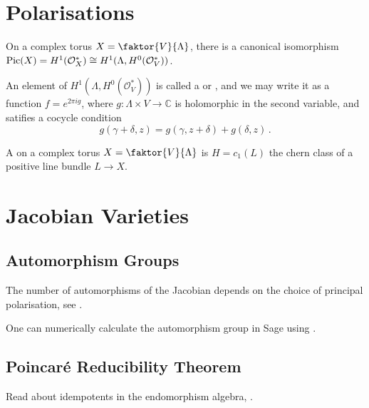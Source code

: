 \documentclass{article}
\begin{document}
\section{Polarisations}
\begin{lemma}
	On a complex torus $X = \faktor{V}{\Lambda}$, there is a canonical isomorphism $\operatorname{Pic}(X) = H^1(\mathcal{O}_X^\ast) \cong H^1(\Lambda , H^0(\mathcal{O}_V^\ast))$. 
\end{lemma}
An element of $H^1(\Lambda , H^0(\mathcal{O}_V^\ast))$ is called a  or , and we may write it as a function $f = e^{2 \pi i g}$, where $g:\Lambda \times V \to \mathbb{C}$ is holomorphic in the second variable, and satifies a cocycle condition 
\[
g(\gamma + \delta, z) = g(\gamma, z+\delta) + g(\delta, z) \, . 
\] 


\begin{definition}
	A  on a complex torus $X = \faktor{V}{\Lambda}$ is $H=  c_1(L)$ the chern class of a positive line bundle $L \to X$. 
\end{definition}


\section{Jacobian Varieties}




\subsection{Automorphism Groups}
The number of automorphisms of the Jacobian depends on the choice of principal polarisation, see \cite{Lee2018}. 

One can numerically calculate the automorphism group in Sage using \cite{Bruin2019}. 


\subsection{Poincar\'e Reducibility Theorem}
Read about idempotents in the endomorphism algebra, \cite{Kani1989}. 


\end{document}
